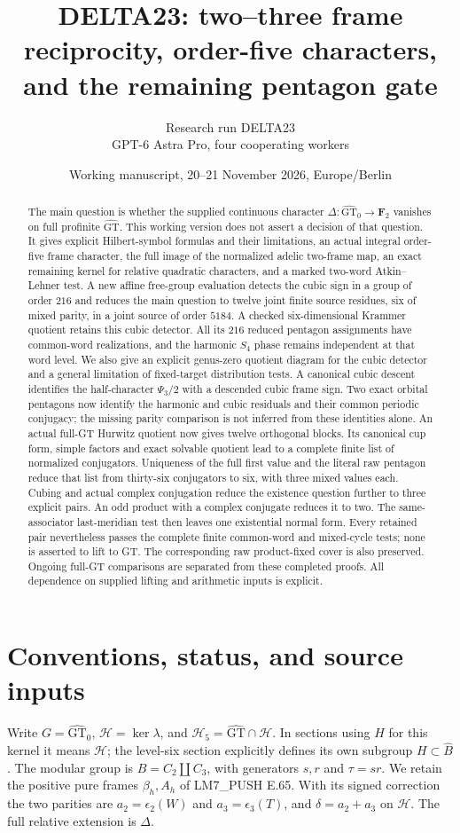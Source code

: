 \documentclass[11pt]{article}
\title{DELTA23: two--three frame reciprocity,\quad
  order-five characters, and the remaining pentagon gate}
\author{Research run DELTA23\\GPT-6 Astra Pro, four cooperating workers}
\date{Working manuscript, 20--21 November 2026, Europe/Berlin}
\newcommand{\GT}{\widehat{\mathrm{GT}}}
\newcommand{\GTz}{\widehat{\mathrm{GT}}_0}
\newcommand{\F}{\mathbf F}
\begin{document}
\maketitle
\begin{abstract}
The main question is whether the supplied continuous character
$\Delta:\GTz\to\F_2$ vanishes on full profinite $\GT$.
This working version does not assert a decision of that question.
It gives explicit Hilbert-symbol formulas and their limitations,
an actual integral order-five frame character, the full image of
the normalized adelic two-frame map, an exact remaining kernel
for relative quadratic characters, and a marked two-word
Atkin--Lehner test.  A new affine free-group evaluation detects
the cubic sign in a group of order $216$ and reduces the main
question to twelve joint finite source residues, six of mixed
parity, in a joint source of order $5184$. A checked six-dimensional
Krammer quotient retains this cubic detector. All its $216$
reduced pentagon assignments have common-word realizations, and
the harmonic $S_4$ phase remains independent at that word level.
We also give an explicit genus-zero quotient diagram for the
cubic detector and a general limitation of fixed-target
distribution tests. A canonical cubic descent identifies the
half-character $\Psi_3/2$ with a descended cubic frame sign.
Two exact orbital pentagons now identify the harmonic and cubic
residuals and their common periodic conjugacy; the missing parity
comparison is not inferred from these identities alone.
An actual full-GT Hurwitz quotient now gives twelve orthogonal
blocks. Its canonical cup form, simple factors and exact solvable
quotient lead to a complete finite list of normalized conjugators.
Uniqueness of the full first value and the literal raw pentagon
reduce that list from thirty-six conjugators to six, with three
mixed values each. Cubing and actual complex conjugation reduce
the existence question further to three explicit pairs. An odd product
with a complex conjugate reduces it to two. The same-associator
last-meridian test then leaves one existential normal form.
Every retained pair nevertheless passes the complete finite
common-word and mixed-cycle tests; none is asserted to lift to GT.
The corresponding raw product-fixed cover is also preserved.
Ongoing full-GT comparisons are separated
from these completed proofs. All dependence on supplied
lifting and arithmetic inputs is explicit.
\end{abstract}
\tableofcontents

\section{Conventions, status, and source inputs}
Write $G=\GTz$, $\mathcal H=\ker\lambda$, and
$\mathcal H_5=\GT\cap\mathcal H$.  In sections using $H$
for this kernel it means $\mathcal H$; the level-six section
explicitly defines its own subgroup $H\subset\widehat B$.
The modular group is $B=C_2\amalg C_3$, with generators
$s,r$ and $\tau=sr$.  We retain the positive pure frames
$\beta_h,A_h$ of LM7\_PUSH E.65.  With its signed correction
the two parities are $a_2=\epsilon_2(W)$ and
$a_3=\epsilon_3(T)$, and $\delta=a_2+a_3$ on $\mathcal H$.
The full relative extension is $\Delta$.
\end{document}
